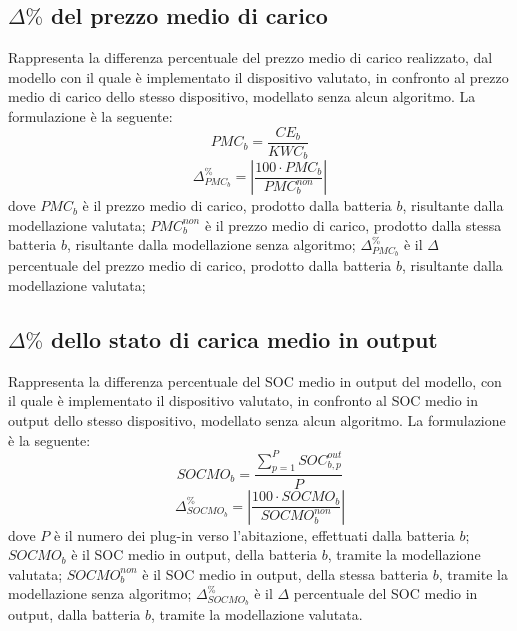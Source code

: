 \documentclass[italian, Lau, oneside]{sapthesis}
\begin{document}
\subsection{$\Delta \%$ del prezzo medio di carico}
Rappresenta la differenza percentuale del prezzo medio di carico realizzato, dal modello con il quale è implementato il dispositivo valutato, in confronto al prezzo medio di carico dello stesso dispositivo, modellato senza alcun algoritmo. La formulazione è la seguente:
\begin{equation}
    PMC_b = \frac{CE_b}{KWC_b}
\end{equation}
\begin{equation}
    \Delta ^\%_{PMC_b} = \left| \frac{100 \cdot PMC_b}{PMC^{non}_b} \right|
\end{equation}
dove $PMC_b$ è il prezzo medio di carico, prodotto dalla batteria $b$, risultante dalla modellazione valutata; $PMC^{non}_b$ è il prezzo medio di carico, prodotto dalla stessa batteria $b$, risultante dalla modellazione senza algoritmo; $\Delta ^\%_{PMC_b}$ è il $\Delta $ percentuale del prezzo medio di carico, prodotto dalla batteria $b$, risultante dalla modellazione valutata;

\subsection{$\Delta \%$ dello stato di carica medio in output}
Rappresenta la differenza percentuale del SOC medio in output del modello, con il quale è implementato il dispositivo valutato, in confronto al SOC medio in output dello stesso dispositivo, modellato senza alcun algoritmo. La formulazione è la seguente:
\begin{equation}
    SOCMO_b = \frac{\sum^{P}_{p = 1} SOC^{out}_{b, p}}{P}
\end{equation}
\begin{equation}
    \Delta ^\%_{SOCMO_b} = \left| \frac{100 \cdot SOCMO_b}{SOCMO^{non}_b} \right|
\end{equation}
dove $P$ è il numero dei plug-in verso l'abitazione, effettuati dalla batteria $b$; $SOCMO_b$ è il SOC medio in output, della batteria $b$, tramite la modellazione valutata; $SOCMO^{non}_b$ è il SOC medio in output, della stessa batteria $b$, tramite la modellazione senza algoritmo; $\Delta ^\%_{SOCMO_b}$ è il $\Delta $ percentuale del SOC medio in output, dalla batteria $b$, tramite la modellazione valutata.

    
\end{document}

